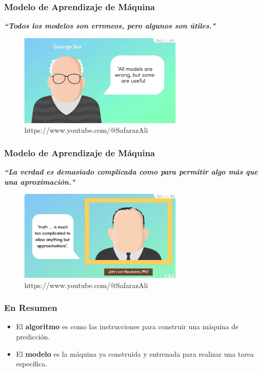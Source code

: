 \documentclass{beamer}
\begin{document}
	
\begin{frame}
\frametitle{Modelo de Aprendizaje de Máquina}
\textit{\textbf{``Todos los modelos son erroneos, pero algunos son útiles."}}
\begin{figure}
	\includegraphics[width=0.7\textwidth]{Box_imagen.jpg}
	\caption{https://www.youtube.com/@SafarazAli}
\end{figure}
\end{frame}

 	
	
\begin{frame}
\frametitle{Modelo de Aprendizaje de Máquina}
\textit{\textbf{``La verdad es demasiado complicada como para permitir algo más que una aproximación."}}
\begin{figure}
	\includegraphics[width=0.7\textwidth]{Von_Newman_imagen}
	\caption{https://www.youtube.com/@SafarazAli}
\end{figure}
\end{frame}
	
	
\begin{frame}
	\frametitle{En Resumen}
	\begin{itemize}
		\item El \textbf{algoritmo} es como las instrucciones para construir una máquina de predicción.
		\item El \textbf{modelo} es la máquina ya construida y entrenada para realizar una tarea específica.
	\end{itemize}
\end{frame}
	
\end{document}
